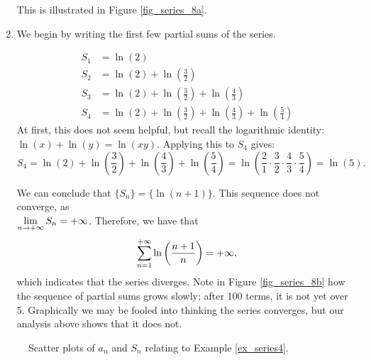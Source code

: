 \begin{example}
\begin{enumerate}
This is illustrated in Figure \ref{fig_series_8a}.

\item		We begin by writing the first few partial sums of the series.

\begin{align*}
S_1 &= \ln\left(2\right) \\
S_2 &= \ln\left(2\right)+\ln\left(\frac32\right) \\
S_3 &= \ln\left(2\right)+\ln\left(\frac32\right)+\ln\left(\frac43\right) \\
S_4 &= \ln\left(2\right)+\ln\left(\frac32\right)+\ln\left(\frac43\right)+\ln\left(\frac54\right) 
\end{align*}
At first, this does not seem helpful, but recall the logarithmic identity: $\ln (x)+\ln (y) = \ln (xy).$ Applying this to $S_4$ gives:
$$S_4 = \ln\left(2\right)+\ln\left(\frac32\right)+\ln\left(\frac43\right)+\ln\left(\frac54\right) = \ln\left(\frac21\cdot\frac32\cdot\frac43\cdot\frac54\right) = \ln\left(5\right).$$

We can conclude that $\{S_n\} = \big\{\ln (n+1)\big\}$. This sequence  does not converge, as \\ $\displaystyle \lim_{n\to+\infty}S_n=+\infty$. Therefore, we have that  
$$\displaystyle\sum_{n=1}^{+\infty}  \ln\left(\frac{n+1}{n}\right)=+\infty,$$ which indicates that
 the series diverges. Note in Figure \ref{fig_series_8b} how the sequence of partial sums grows slowly; after 100 terms, it is not yet over 5. Graphically we may be fooled into thinking the series converges, but our analysis above shows that it does not.
\end{enumerate}
\begin{figure}[H]
\centering
\qquad
{}
\caption{Scatter plots of $a_n$ and $S_n$ relating to Example \ref{ex_series4}.}
\end{figure}

\end{example}


